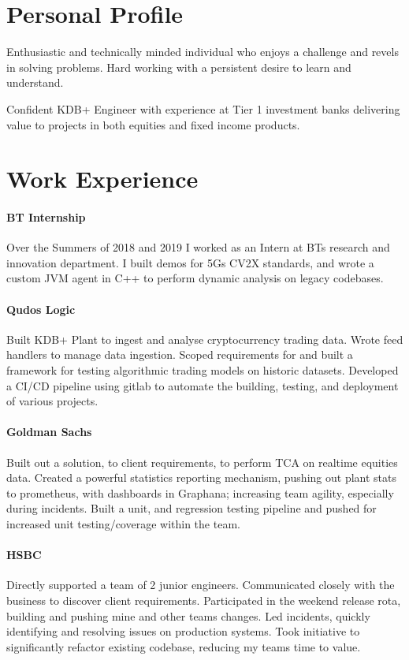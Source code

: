 \documentclass[9pt,a4paper]{article}
\begin{document}
\begin{multicols*}{2}
\section*{Personal Profile}
Enthusiastic and technically minded individual who enjoys a challenge and revels in solving problems.
Hard working with a persistent desire to learn and understand.

Confident KDB+ Engineer with experience at Tier 1 investment banks delivering value to projects in both equities and fixed income products.

\section*{Work Experience}

\paragraph{BT Internship} Over the Summers of 2018 and 2019 I worked as an Intern at BTs research and innovation department. I built demos for 5Gs CV2X standards, and wrote a custom JVM agent in C++ to perform dynamic analysis on legacy codebases.

\paragraph{Qudos Logic} Built KDB+ Plant to ingest and analyse cryptocurrency trading data.
Wrote feed handlers to manage data ingestion.
Scoped requirements for and built a framework for testing algorithmic trading models on historic datasets.
Developed a CI/CD pipeline using gitlab to automate the building, testing, and deployment of various projects.

\paragraph{Goldman Sachs} Built out a solution, to client requirements, to perform TCA on realtime equities data.
Created a powerful statistics reporting mechanism, pushing out plant stats to prometheus, with dashboards in Graphana; increasing team agility, especially during incidents.
Built a unit, and regression testing pipeline and pushed for increased unit testing/coverage within the team.

\paragraph{HSBC} Directly supported a team of 2 junior engineers.
Communicated closely with the business to discover client requirements.
Participated in the weekend release rota, building and pushing mine and other teams changes.
Led incidents, quickly identifying and resolving issues on production systems.
Took initiative to significantly refactor existing codebase, reducing my teams time to value.


\end{multicols*}
\end{document}
